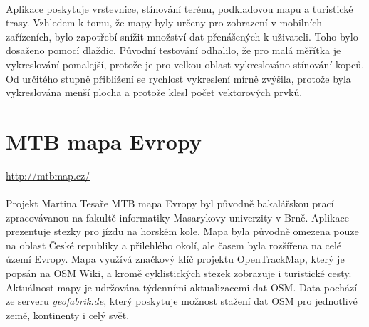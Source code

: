 \documentclass[11pt,a4paper,titlepage,oneside]{book}
\begin{document}
		\paragraph{}  Aplikace poskytuje vrstevnice, stínování terénu, podkladovou mapu a turistické trasy. Vzhledem k tomu, že mapy byly určeny pro zobrazení v mobilních zařízeních, bylo zapotřebí snížit množství dat přenášených k uživateli. Toho bylo dosaženo pomocí dlaždic. Původní testování odhalilo, že pro malá měřítka je vykreslování pomalejší, protože je pro velkou oblast vykreslováno stínování kopců\cite{OTM}. Od určitého stupně přiblížení se rychlost vykreslení mírně zvýšila, protože byla vykreslována menší plocha a protože klesl počet vektorových prvků.

	\section{MTB mapa Evropy}
		\label{sec:MTB}
		\url{http://mtbmap.cz/}
		\paragraph{} Projekt Martina Tesaře MTB mapa Evropy byl původně bakalářskou prací zpracovávanou na fakultě informatiky Masarykovy univerzity v Brně. Aplikace prezentuje stezky pro jízdu na horském kole. Mapa byla původně omezena pouze na oblast České republiky a přilehlého okolí, ale časem byla rozšířena na celé území Evropy. Mapa využívá značkový klíč projektu OpenTrackMap, který je popsán na \ac{OSM} Wiki\cite{otm_klic}, a kromě cyklistických stezek zobrazuje i turistické cesty. Aktuálnost mapy je udržována týdenními aktualizacemi dat \ac{OSM}. Data pochází ze serveru \textit{geofabrik.de}, který poskytuje možnost stažení dat \ac{OSM} pro jednotlivé země, kontinenty i celý svět.



\end{document}

